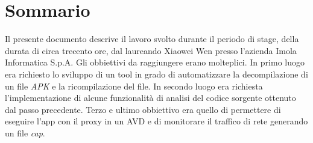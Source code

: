 
\cleardoublepage
{}
{}
\begingroup
\let\clearpage\relax
\let\cleardoublepage\relax
\let\cleardoublepage\relax

\chapter*{Sommario}

Il presente documento descrive il lavoro svolto durante il periodo di stage, della durata di circa trecento ore, dal laureando Xiaowei Wen presso l'azienda Imola Informatica S.p.A. Gli obbiettivi da raggiungere erano molteplici. In primo luogo era richiesto lo sviluppo di un tool in grado di automatizzare la decompilazione di un file \textit{APK} e la ricompilazione del file. In secondo luogo era richiesta l'implementazione di alcune funzionalità di analisi del codice sorgente ottenuto dal passo precedente.
Terzo e ultimo obbiettivo era quello di permettere di eseguire l'app con il proxy in un AVD e di monitorare il traffico di rete generando un file \textit{cap}.

%
%

\endgroup			

\vfill

